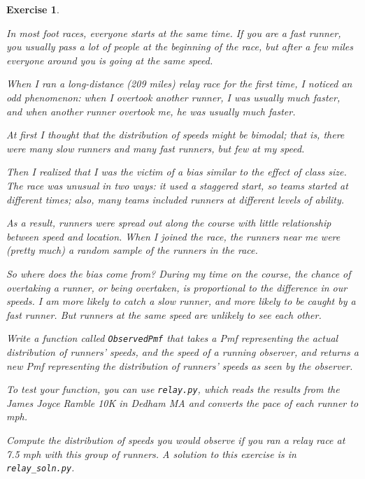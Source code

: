 \documentclass[12pt]{book}
\theoremstyle{exercise}
\newtheorem{exercise}{Exercise}[chapter]
\begin{document}
\begin{exercise}%
\label{relay}

In most foot races, everyone starts at the same time.  If you are a
fast runner, you usually pass a lot of people at the beginning of the
race, but after a few miles everyone around you is going at the same
speed.%

When I ran a long-distance (209 miles) relay race for the first
time, I noticed an odd phenomenon: when I overtook another runner, I
was usually much faster, and when another runner overtook me, he was
usually much faster.

At first I thought that the distribution of speeds might be bimodal;
that is, there were many slow runners and many fast runners, but few
at my speed.

Then I realized that I was the victim of a bias similar to the
effect of class size.  The race
was unusual in two ways: it used a staggered start, so teams started
at different times; also, many teams included runners at different
levels of ability.%
%

As a result, runners were spread out along the course with little
relationship between speed and location.  When I joined the race, the
runners near me were (pretty much) a random sample of the runners in
the race.

So where does the bias come from?  During my time on the course, the
chance of overtaking a runner, or being overtaken, is proportional to
the difference in our speeds.  I am more likely to catch a slow
runner, and more likely to be caught by a fast runner.  But runners
at the same speed are unlikely to see each other.

Write a function called {\tt ObservedPmf} that takes a Pmf representing
the actual distribution of runners' speeds, and the speed of a running
observer, and returns a new Pmf representing the distribution of
runners' speeds as seen by the observer.%
%

To test your function, you can use {\tt relay.py}, which  reads the
results from the James Joyce Ramble 10K in Dedham MA and converts the
pace of each runner to mph.

Compute the distribution of speeds you would observe if you ran a
relay race at 7.5 mph with this group of runners.  A solution to this
exercise is in \verb"relay_soln.py".
\end{exercise}
\end{document}
